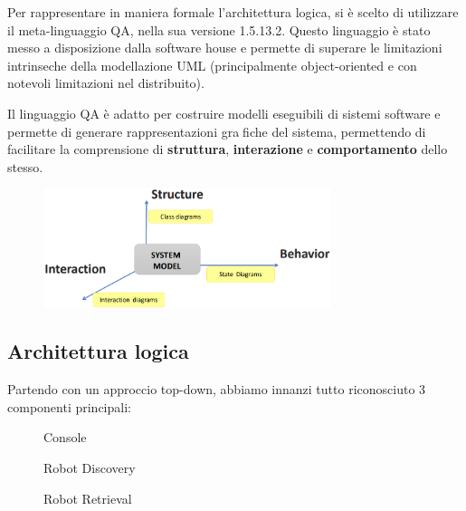 Per rappresentare in maniera formale l'architettura logica, si è scelto di utilizzare il meta-linguaggio QA, nella sua versione 1.5.13.2.
Questo linguaggio è stato messo a disposizione dalla software house e permette di superare le limitazioni intrinseche della modellazione UML
(principalmente object-oriented e con notevoli limitazioni nel distribuito).

Il linguaggio QA è adatto per costruire modelli eseguibili di sistemi software e permette di generare rappresentazioni grafiche del sistema,
permettendo di facilitare la comprensione di \textbf{struttura}, \textbf{interazione} e \textbf{comportamento} dello stesso.

\begin{figure}[htbp]
  \centering
  \includegraphics[width=0.75\textwidth]{res/logicalArchitecture.png}%
  \label{fig:logicalArchitecture}
\end{figure}

\subsection{Architettura logica}

Partendo con un approccio top-down, abbiamo innanzi tutto riconosciuto 3 componenti principali:

\begin{figure}[htbp]
  \centering
  \caption{Console}%
  \label{fig:sp1:console}
\end{figure}

\begin{figure}[htbp]
  \centering
  \caption{Robot Discovery}%
  \label{fig:sp1:robotdiscovery}
\end{figure}

\begin{figure}[htbp]
  \centering
  \caption{Robot Retrieval}%
  \label{fig:sp1:robotretrieval}
\end{figure}


